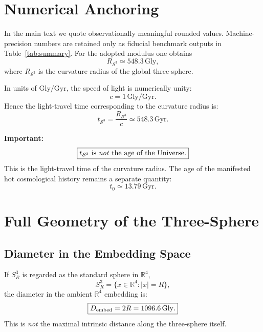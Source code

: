 \documentclass[aps,prd,onecolumn,superscriptaddress,longbibliography,nofootinbib,notitlepage]{revtex4-2}
\newcommand{\Gly}{\,\mathrm{Gly}}
\newcommand{\Gyr}{\,\mathrm{Gyr}}
\begin{document}
\section{Numerical Anchoring}
\label{sec:numerical}

In the main text we quote observationally meaningful rounded values. Machine-precision
numbers are retained only as fiducial benchmark outputs in Table~\ref{tab:summary}.
For the adopted modulus one obtains
\begin{equation}
  R_{\mathcal{S}^3}\simeq 548.3\Gly,
\end{equation}
where $R_{\mathcal{S}^3}$ is the curvature radius of the global three-sphere.

In units of $\mathrm{Gly}/\mathrm{Gyr}$, the speed of light is numerically unity:
\begin{equation}
  c = 1\,\mathrm{Gly/Gyr}.
\end{equation}
Hence the light-travel time corresponding to the curvature radius is:
\begin{equation}
  t_{\mathcal{S}^3} = \frac{R_{\mathcal{S}^3}}{c}
  \simeq 548.3\Gyr.
\end{equation}

\textbf{Important:}
\begin{equation}
  \boxed{t_{\mathcal{S}^3} \text{ is \emph{not} the age of the Universe.}}
\end{equation}
This is the light-travel time of the curvature radius. The age of the manifested
hot cosmological history remains a separate quantity:
\begin{equation}
  t_0 \simeq 13.79\Gyr.
\end{equation}

\section{Full Geometry of the Three-Sphere}
\label{sec:geometry}

\subsection{Diameter in the Embedding Space}

If $S^3_R$ is regarded as the standard sphere in $\mathbb{R}^4$,
\begin{equation}
  S^3_R = \{x \in \mathbb{R}^4 : |x| = R\},
\end{equation}
the diameter in the ambient $\mathbb{R}^4$ embedding is:
\begin{equation}
  \boxed{D_{\rm embed} = 2R = 1096.6\Gly.}
\end{equation}
This is \emph{not} the maximal intrinsic distance along the three-sphere itself.
\end{document}
